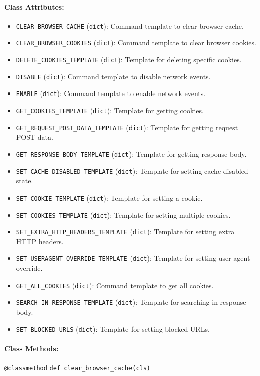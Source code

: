 \documentclass{article}
\begin{document}
\paragraph{Class Attributes:}
\begin{itemize}
    \item \texttt{CLEAR\_BROWSER\_CACHE} (\texttt{dict}): Command template to clear browser cache.
    \item \texttt{CLEAR\_BROWSER\_COOKIES} (\texttt{dict}): Command template to clear browser cookies.
    \item \texttt{DELETE\_COOKIES\_TEMPLATE} (\texttt{dict}): Template for deleting specific cookies.
    \item \texttt{DISABLE} (\texttt{dict}): Command template to disable network events.
    \item \texttt{ENABLE} (\texttt{dict}): Command template to enable network events.
    \item \texttt{GET\_COOKIES\_TEMPLATE} (\texttt{dict}): Template for getting cookies.
    \item \texttt{GET\_REQUEST\_POST\_DATA\_TEMPLATE} (\texttt{dict}): Template for getting request POST data.
    \item \texttt{GET\_RESPONSE\_BODY\_TEMPLATE} (\texttt{dict}): Template for getting response body.
    \item \texttt{SET\_CACHE\_DISABLED\_TEMPLATE} (\texttt{dict}): Template for setting cache disabled state.
    \item \texttt{SET\_COOKIE\_TEMPLATE} (\texttt{dict}): Template for setting a cookie.
    \item \texttt{SET\_COOKIES\_TEMPLATE} (\texttt{dict}): Template for setting multiple cookies.
    \item \texttt{SET\_EXTRA\_HTTP\_HEADERS\_TEMPLATE} (\texttt{dict}): Template for setting extra HTTP headers.
    \item \texttt{SET\_USERAGENT\_OVERRIDE\_TEMPLATE} (\texttt{dict}): Template for setting user agent override.
    \item \texttt{GET\_ALL\_COOKIES} (\texttt{dict}): Command template to get all cookies.
    \item \texttt{SEARCH\_IN\_RESPONSE\_TEMPLATE} (\texttt{dict}): Template for searching in response body.
    \item \texttt{SET\_BLOCKED\_URLS} (\texttt{dict}): Template for setting blocked URLs.
\end{itemize}

\paragraph{Class Methods:}
\noindent\texttt{@classmethod}
\noindent\texttt{def clear\_browser\_cache(cls)}
\end{document}
